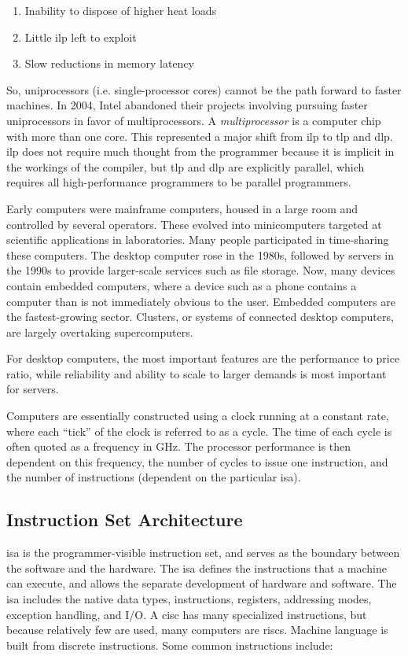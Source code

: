 \documentclass[10pt]{article}
\begin{document}
\begin{flushleft}
\begin{enumerate}
\item Inability to dispose of higher heat loads
\item Little \gls{ilp} left to exploit
\item Slow reductions in memory latency
\end{enumerate}

So, uniprocessors (i.e. single-processor cores) cannot be the path forward to faster machines. In 2004, Intel abandoned their projects involving pursuing faster uniprocessors in favor of multiprocessors. A {\it multiprocessor} is a computer chip with more than one core. This represented a major shift from \gls{ilp} to \gls{tlp} and \gls{dlp}. \gls{ilp} does not require much thought from the programmer because it is implicit in the workings of the compiler, but \gls{tlp} and \gls{dlp} are explicitly parallel, which requires all high-performance programmers to be parallel programmers.

Early computers were mainframe computers, housed in a large room and controlled by several operators. These evolved into minicomputers targeted at scientific applications in laboratories. Many people participated in time-sharing these computers. The desktop computer rose in the 1980s, followed by servers in the 1990s to provide larger-scale services such as file storage. 
Now, many devices contain embedded computers, where a device such as a phone contains a computer than is not immediately obvious to the user. Embedded computers are the fastest-growing sector. Clusters, or systems of connected desktop computers, are largely overtaking supercomputers.

For desktop computers, the most important features are the performance to price ratio, while reliability and ability to scale to larger demands is most important for servers. 

Computers are essentially constructed using a clock running at a constant rate, where each ``tick'' of the clock is referred to as a cycle. The time of each cycle is often quoted as a frequency in GHz. The processor performance is then dependent on this frequency, the number of cycles to issue one instruction, and the number of instructions (dependent on the particular \gls{isa}). 

\subsection{Instruction Set Architecture}
\gls{isa} is the programmer-visible instruction set, and serves as the boundary between the software and the hardware. The \gls{isa} defines the instructions that a machine can execute, and allows the separate development of hardware and software. The \gls{isa} includes the native data types, instructions, registers, addressing modes, exception handling, and I/O. A \gls{cisc} has many specialized instructions, but because relatively few are used, many computers are \gls{risc}s. Machine language is built from discrete instructions. Some common instructions include:


\end{flushleft}
\end{document}
